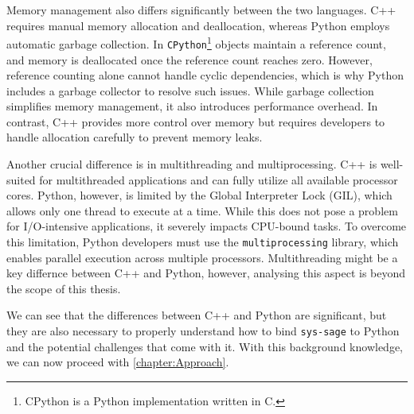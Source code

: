 Memory management also differs significantly between the two languages. C++ requires manual memory allocation and deallocation, whereas Python employs automatic garbage collection. In \texttt{CPython}\footnote{CPython is a Python implementation written in C.} objects maintain a reference count, and memory is deallocated once the reference count reaches zero. However, reference counting alone cannot handle cyclic dependencies, which is why Python includes a garbage collector to resolve such issues. While garbage collection simplifies memory management, it also introduces performance overhead. In contrast, C++ provides more control over memory but requires developers to handle allocation carefully to prevent memory leaks.\cite{python-gc}

Another crucial difference is in multithreading and multiprocessing. C++ is well-suited for multithreaded applications and can fully utilize all available processor cores. Python, however, is limited by the Global Interpreter Lock (GIL), which allows only one thread to execute at a time. While this does not pose a problem for I/O-intensive applications, it severely impacts CPU-bound tasks. To overcome this limitation, Python developers must use the \texttt{multiprocessing} library, which enables parallel execution across multiple processors. Multithreading might be a key differnce between C++ and Python, however, analysing this aspect is beyond the scope of this thesis.\parencite{python-threading}

\smallskip
We can see that the differences between C++ and Python are significant, but they are also necessary to properly understand how to bind \texttt{sys-sage} to Python and the potential challenges that come with it. With this background knowledge, we can now proceed with \autoref{chapter:Approach}.




